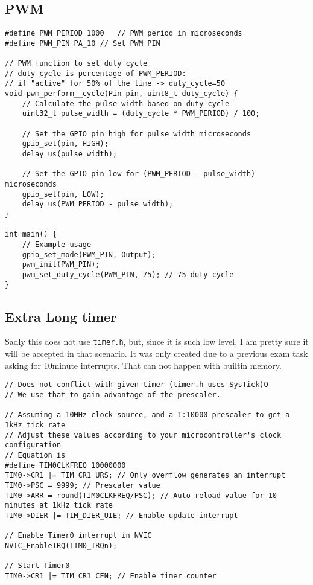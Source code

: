 \documentclass[11pt]{article}
\begin{document}
\subsection{PWM}
\label{sec:org19d60d8}
\begin{verbatim}
#define PWM_PERIOD 1000   // PWM period in microseconds
#define PWM_PIN PA_10 // Set PWM PIN

// PWM function to set duty cycle
// duty cycle is percentage of PWM_PERIOD:
// if "active" for 50% of the time -> duty_cycle=50
void pwm_perform__cycle(Pin pin, uint8_t duty_cycle) {
    // Calculate the pulse width based on duty cycle
    uint32_t pulse_width = (duty_cycle * PWM_PERIOD) / 100;

    // Set the GPIO pin high for pulse_width microseconds
    gpio_set(pin, HIGH);
    delay_us(pulse_width);

    // Set the GPIO pin low for (PWM_PERIOD - pulse_width) microseconds
    gpio_set(pin, LOW);
    delay_us(PWM_PERIOD - pulse_width);
}

int main() {
    // Example usage
    gpio_set_mode(PWM_PIN, Output);
    pwm_init(PWM_PIN);
    pwm_set_duty_cycle(PWM_PIN, 75); // 75 duty cycle
}

\end{verbatim}
\subsection{Extra Long timer}
\label{sec:org11dbe52}
Sadly this does not use \texttt{timer.h}, but, since it is such low level, I am
pretty sure it will be accepted in that scenario. It was only created
due to a previous exam task asking for 10minute interrupts. That can
not happen with builtin memory.

\begin{verbatim}
// Does not conflict with given timer (timer.h uses SysTick)O
// We use that to gain advantage of the prescaler.

// Assuming a 10MHz clock source, and a 1:10000 prescaler to get a 1kHz tick rate
// Adjust these values according to your microcontroller's clock configuration
// Equation is 
#define TIM0CLKFREQ 10000000
TIM0->CR1 |= TIM_CR1_URS; // Only overflow generates an interrupt
TIM0->PSC = 9999; // Prescaler value
TIM0->ARR = round(TIM0CLKFREQ/PSC); // Auto-reload value for 10 minutes at 1kHz tick rate
TIM0->DIER |= TIM_DIER_UIE; // Enable update interrupt

// Enable Timer0 interrupt in NVIC
NVIC_EnableIRQ(TIM0_IRQn);

// Start Timer0
TIM0->CR1 |= TIM_CR1_CEN; // Enable timer counter
\end{verbatim}
\end{document}
